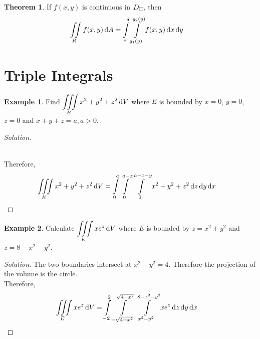 \documentclass[fleqn, a4paper, 10pt]{article}
\theoremstyle{definition}
\newtheorem{example}{Example}
\theoremstyle{theorem}
\newtheorem{theorem}{Theorem}
\theoremstyle{remark}
\newenvironment{solution}
	{\begin{proof}[Solution]\let\qed\relax}
	{\end{proof}}
\begin{document}
\begin{multicols}{2}
\begin{theorem}
	If $f(x,y)$ is continuous in $D_{\textnormal{II}}$, then
	\begin{align*}
		\iint\limits_{R} f(x,y) \dif A &= \int\limits_{c}^{d} \int\limits_{g_1(y)}^{g_2(y)} f(x,y) \dif x \dif y
	\end{align*}
\end{theorem}

\section{Triple Integrals}

\begin{example}
	Find $\displaystyle \iiint\limits_{E} x^2 + y^2 + z^2 \dif V$ where $E$ is bounded by $x = 0$, $y = 0$, $z = 0$ and $x + y + z = a, a > 0$.
\end{example}

\begin{solution}
	~\\
	\\
	Therefore,
	\begin{align*}
		\iiint\limits_{E} x^2 + y^2 + z^2 \dif V &= \int\limits_{0}^{a} \int\limits_{0}^{a - x} \int\limits_{0}^{a - x - y} x^2 + y^2 + z^2 \dif z \dif y \dif x
	\end{align*}
\end{solution}

\begin{example}
	Calculate $\displaystyle \iiint\limits_{E} x e^z \dif V$ where $E$ is bounded by $z = x^2 + y^2$ and $z = 8 - x^2 - y^2$.
\end{example}

\begin{solution}
	The two boundaries intersect at $x^2 + y^2 = 4$. Therefore the projection of the volume is the circle.\\
	Therefore,
	\begin{align*}
		\iiint\limits_{E} x e^z \dif V &= \int\limits_{-2}^{2} \int\limits_{-\sqrt{4 - x^2}}^{\sqrt{4 - x^2}} \int\limits_{x^2 + y^2}^{8 - x^2 - y^2} x e^z \dif z \dif y \dif x
	\end{align*}
\end{solution}


\end{multicols}
\end{document}
